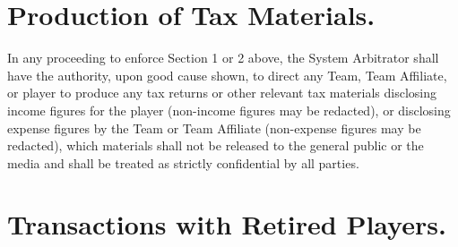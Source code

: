 \documentclass[
]{book}
\begin{document}
\hypertarget{production-of-tax-materials.}{%
\section{Production of Tax Materials.}\label{production-of-tax-materials.}}

In any proceeding to enforce Section 1 or 2 above, the System Arbitrator shall have the authority, upon good cause shown, to direct any Team, Team Affiliate, or player to produce any tax returns or other relevant tax materials disclosing income figures for the player (non-income figures may be redacted), or disclosing expense figures by the Team or Team Affiliate (non-expense figures may be redacted), which materials shall not be released to the general public or the media and shall be treated as strictly confidential by all parties.

\hypertarget{transactions-with-retired-players.}{%
\section{Transactions with Retired Players.}\label{transactions-with-retired-players.}}
\end{document}
